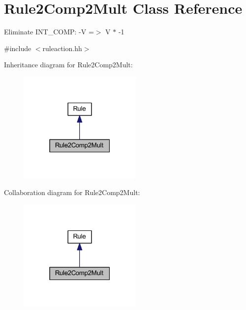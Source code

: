 \hypertarget{class_rule2_comp2_mult}{}\section{Rule2\+Comp2\+Mult Class Reference}
\label{class_rule2_comp2_mult}


Eliminate I\+N\+T\+\_\+C\+O\+MP\+: {\ttfamily -\/V =$>$ V $\ast$ -\/1}  




{\ttfamily \#include $<$ruleaction.\+hh$>$}



Inheritance diagram for Rule2\+Comp2\+Mult\+:
\nopagebreak
\begin{figure}[H]
\begin{center}
\leavevmode
\includegraphics[width=171pt]{class_rule2_comp2_mult__inherit__graph}
\end{center}
\end{figure}


Collaboration diagram for Rule2\+Comp2\+Mult\+:
\nopagebreak
\begin{figure}[H]
\begin{center}
\leavevmode
\includegraphics[width=171pt]{class_rule2_comp2_mult__coll__graph}
\end{center}
\end{figure}
